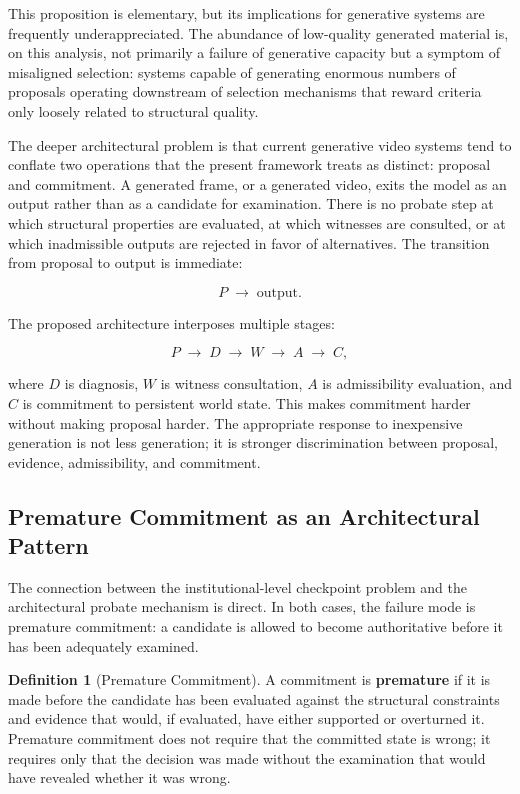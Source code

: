 \documentclass[11pt,a4paper]{article}
\theoremstyle{plain}
\theoremstyle{definition}
\newtheorem{definition}[theorem]{Definition}
\theoremstyle{remark}
\begin{document}
This proposition is elementary, but its implications for generative systems are frequently underappreciated. The abundance of low-quality generated material is, on this analysis, not primarily a failure of generative capacity but a symptom of misaligned selection: systems capable of generating enormous numbers of proposals operating downstream of selection mechanisms that reward criteria only loosely related to structural quality.

The deeper architectural problem is that current generative video systems tend to conflate two operations that the present framework treats as distinct: proposal and commitment. A generated frame, or a generated video, exits the model as an output rather than as a candidate for examination. There is no probate step at which structural properties are evaluated, at which witnesses are consulted, or at which inadmissible outputs are rejected in favor of alternatives. The transition from proposal to output is immediate:

\[
P \;\longrightarrow\; \text{output}.
\]

The proposed architecture interposes multiple stages:

\[
P \;\longrightarrow\; D \;\longrightarrow\; W \;\longrightarrow\; A \;\longrightarrow\; C,
\]

where $D$ is diagnosis, $W$ is witness consultation, $A$ is admissibility evaluation, and $C$ is commitment to persistent world state. This makes commitment harder without making proposal harder. The appropriate response to inexpensive generation is not less generation; it is stronger discrimination between proposal, evidence, admissibility, and commitment.

\subsection{Premature Commitment as an Architectural Pattern}

The connection between the institutional-level checkpoint problem and the architectural probate mechanism is direct. In both cases, the failure mode is premature commitment: a candidate is allowed to become authoritative before it has been adequately examined.

\begin{definition}[Premature Commitment]
A commitment is \textbf{premature} if it is made before the candidate has been evaluated against the structural constraints and evidence that would, if evaluated, have either supported or overturned it. Premature commitment does not require that the committed state is wrong; it requires only that the decision was made without the examination that would have revealed whether it was wrong.
\end{definition}
\end{document}
